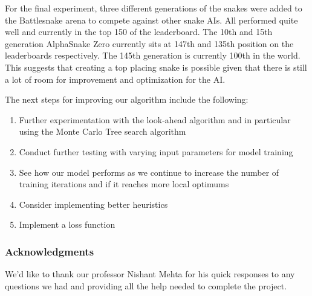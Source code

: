 \documentclass{article}
\begin{document}
For the final experiment, three different generations of the snakes were added
to the Battlesnake arena to compete against other snake AIs. All performed quite
well and currently in the top 150 of the leaderboard. The 10th and 15th
generation AlphaSnake Zero currently sits at 147th and 135th position on the
leaderboards respectively. The 145th generation is currently 100th in the world.
This suggests that creating a top placing snake is possible given that there is
still a lot of room for improvement and optimization for the AI.

The next steps for improving our algorithm include the following:

\begin{enumerate}
  \item Further experimentation with the look-ahead algorithm and in particular
        using the Monte Carlo Tree search algorithm
  \item Conduct further testing with varying input parameters for model training
  \item See how our model performs as we continue to increase the number of
        training iterations and if it reaches more local optimums
  \item Consider implementing better heuristics
  \item Implement a loss function
\end{enumerate}



\subsubsection*{Acknowledgments}

We'd like to thank our professor Nishant Mehta for his quick responses to any
questions we had and providing all the help needed to complete the project.

\newpage

\small


% 


\end{document}

